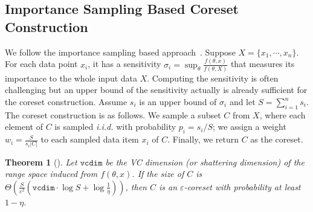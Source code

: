 \documentclass{article}
\newtheorem{theorem}{Theorem}
\begin{document}

\subsection{Importance Sampling Based Coreset Construction}\label{sec:sensitity}
We follow the importance sampling based approach~\cite{DBLP:conf/soda/LangbergS10}. 
 Suppose $X=\{x_1, \cdots, x_n\}$. For each data point $ x_i $, it has a sensitivity $  \sigma_i=\sup_{\theta} \frac{f(\theta,x)}{f(\theta,X)}$ that measures its importance to the whole input data $X$. 
Computing the sensitivity is often challenging but an upper bound of the sensitivity actually is  already sufficient for the coreset construction. Assume $ s_i $ is an upper bound of $ \sigma_i $ and let $ S=\sum_{i=1}^n s_i $. The coreset construction is as follows. We sample a subset $ C $ from $ X $, where each element of $ C $ is sampled {\em i.i.d.} with probability $ p_i=s_i/S $; we assign a weight $ w_i = \frac{S}{s_i|C|} $ to each sampled data item $x_i$ of $C$. Finally, we return $C$ as the coreset. 


\begin{theorem}[\cite{BravermanFL16}]
\label{the-vccoreset}
Let $ \mathtt{vcdim} $ be the VC dimension (or shattering dimension) of the range space induced from $ f(\theta,x) $. 
	If the size of $ C $ is $ \Theta\left( \frac{S}{\varepsilon^2}\left( \mathtt{vcdim}\cdot\log S+\log\frac{1}{\eta}  \right)  \right) $, then $ C $ is an $ \varepsilon $-coreset with probability at least $ 1-\eta $. 
\end{theorem}
\end{document}

